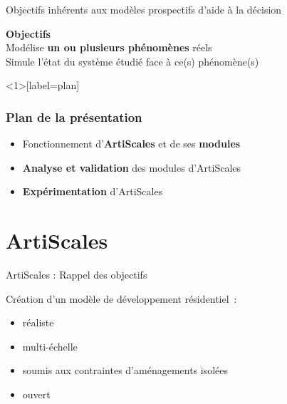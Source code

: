\documentclass[xcolor=table]{beamer}
\begin{document}
\begin{frame}{Objectifs inhérents aux modèles prospectifs d'aide à la décision}
\begin{block}{}
	\textbf{Objectifs}\\
	Modélise \textbf{un ou plusieurs phénomènes} réels\\
	Simule l'état du système étudié face à ce(s) phénomène(s)\\
\end{block}
\end{frame}




\begin{frame}<1>[label=plan]
\frametitle{Plan de la présentation}
	\begin{itemize}
		\item Fonctionnement d'\textbf{ArtiScales} et de ses \textbf{modules}
		\item \textbf{Analyse et validation} des modules d'ArtiScales
		\item \textbf{Expérimentation} d'ArtiScales
	\end{itemize}
\end{frame}




\section{ArtiScales}

\begin{frame}{ArtiScales : Rappel des objectifs}
		\begin{block}{}
		Création d'un modèle de développement résidentiel~:
		\begin{itemize}
			\footnotesize
			\item réaliste %
			\item multi-échelle %
			\item soumis aux contraintes d'aménagements isolées %
			\item ouvert %
		\end{itemize}
	\end{block}
\end{frame}
\end{document}
